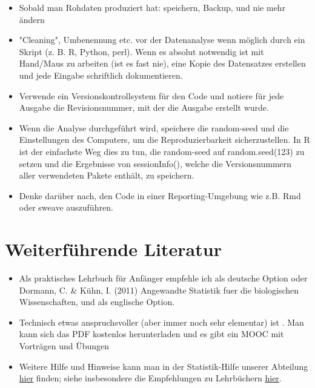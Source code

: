\documentclass[a4paper,twoside]{tufte-book}\usepackage[]{graphicx}\usepackage[]{color}
\begin{document}
\begin{itemize}

\item{Sobald man Rohdaten produziert hat: speichern, Backup, und nie mehr ändern}

\item{"Cleaning", Umbenennung etc. vor der Datenanalyse wenn möglich durch ein Skript (z. B. R, Python, perl). Wenn es absolut notwendig ist mit Hand/Maus zu arbeiten (ist es fast nie), eine Kopie des Datensatzes erstellen und jede Eingabe schriftlich dokumentieren.}

\item{Verwende ein Versionskontrollsystem für den Code und notiere für jede Ausgabe die Revisionsnummer, mit der die Ausgabe erstellt wurde.}

\item{Wenn die Analyse durchgeführt wird, speichere die random-seed und die Einstellungen des Computers, um die Reproduzierbarkeit sicherzustellen. In R ist der einfachste Weg dies zu tun, die random-seed auf random.seed(123) zu setzen und die Ergebnisse von sessionInfo(), welche die Versionsnummern aller verwendeten Pakete enthält, zu speichern.}

\item{Denke darüber nach, den Code in einer Reporting-Umgebung wie z.B. Rmd oder sweave auszuführen.}



\end{itemize}

\section{Weiterführende Literatur}\label{sec: further readings}


\begin{itemize}


\item Als praktisches Lehrbuch für Anfänger empfehle ich als deutsche Option  \citet{Dormann-ParametrischeStatistik-2013} oder Dormann, C. \& Kühn, I. (2011) Angewandte Statistik fuer die biologischen Wissenschaften, und \citet{Gotelli-PrimerEcologicalStatistics-2004} als englische Option. 

\item Technisch etwas anspruchsvoller (aber immer noch sehr elementar) ist \citet{James-IntroductiontoStatistical-2013}. Man kann sich das PDF kostenlos herunterladen und es gibt ein MOOC mit Vorträgen und Übungen

\item Weitere Hilfe und Hinweise kann man in der Statistik-Hilfe unserer Abteilung \href{http://biometry.github.io/APES/}{hier} finden; siehe insbesondere die Empfehlungen zu Lehrbüchern \href{http://biometry.github.io/APES/Stats/stats90-references.html}{hier}.

\end{itemize}
\end{document}
